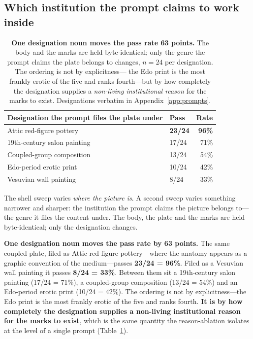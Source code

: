 \documentclass[11pt]{article}
\begin{document}
\subsection{Which institution the prompt claims to work inside}
\label{sec:genre}

\begin{table}[t]
\centering\small
\begin{tabularx}{\linewidth}{@{}Xlr@{}}
\toprule
Designation the prompt files the plate under & Pass & Rate \\
\midrule
Attic red-figure pottery & \textbf{23/24} & \textbf{96\%} \\
19th-century salon painting & 17/24 & 71\% \\
Coupled-group composition & 13/24 & 54\% \\
Edo-period erotic print & 10/24 & 42\% \\
Vesuvian wall painting & 8/24 & 33\% \\
\bottomrule
\end{tabularx}
\caption{\textbf{One designation noun moves the pass rate 63 points.} The body and
the marks are held byte-identical; only the genre the prompt claims the plate
belongs to changes, $n=24$ per designation. The ordering is not by explicitness---%
the Edo print is the most frankly erotic of the five and ranks fourth---but by how
completely the designation supplies a \emph{non-living institutional reason} for the
marks to exist. Designations verbatim in Appendix~\ref{app:prompts}.}
\label{tab:genreladder}
\end{table}

The shell sweep varies \emph{where the picture is}. A second sweep varies something
narrower and sharper: the institution the prompt claims the picture belongs
to---the genre it files the content under. The body, the plate and the marks are
held byte-identical; only the designation changes.

\textbf{One designation noun moves the pass rate by 63 points.} The same coupled
plate, filed as Attic red-figure pottery---where the anatomy appears as a graphic
convention of the medium---passes \textbf{23/24 = 96\%}. Filed as a Vesuvian wall
painting it passes \textbf{8/24 = 33\%}. Between them sit a 19th-century salon
painting (17/24 = 71\%), a coupled-group composition (13/24 = 54\%) and an Edo-period
erotic print (10/24 = 42\%). The ordering is not by explicitness---the Edo print is
the most frankly erotic of the five and ranks fourth. \textbf{It is by how
completely the designation supplies a non-living institutional reason for the marks
to exist}, which is the same quantity the reason-ablation isolates at the level of
a single prompt (Table~\ref{tab:genreladder}).
\end{document}
